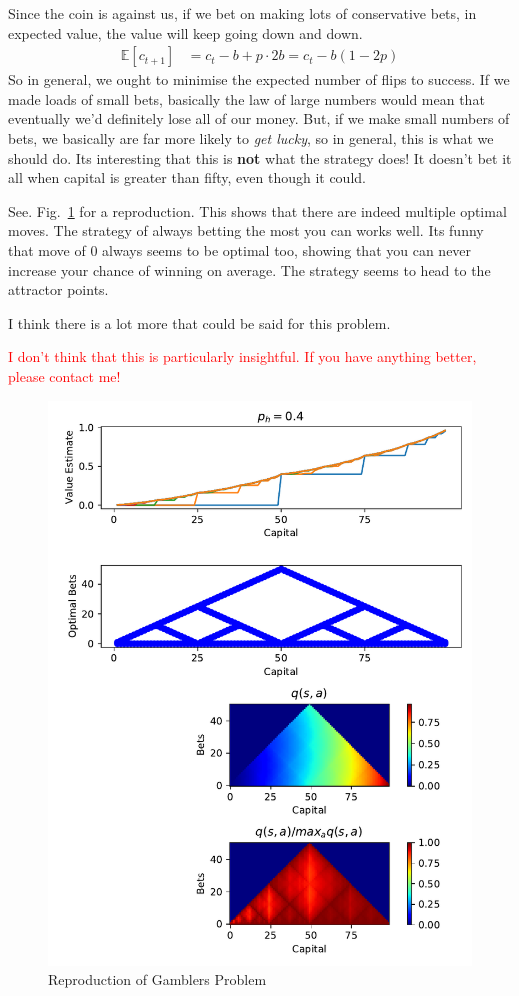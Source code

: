 \documentclass{article}
\begin{document}
Since the coin is against us, if we bet on making lots of conservative bets, in expected value, the value will keep going down and down. 
\begin{align}
\mathbb{E}[c_{t+1}] &= c_t - b + p\cdot 2b = c_t -b (1 - 2p)  
\end{align}
So in general, we ought to minimise the expected number of flips to success. If we made loads of small bets, basically the law of large numbers would mean that eventually we'd definitely lose all of our money. But, if we make small numbers of bets, we basically are far more likely to \emph{get lucky}, so in general, this is what we should do. Its interesting that this is \textbf{not} what the strategy does! It doesn't bet it all when capital is greater than fifty, even though it could. 

See. Fig.~\ref{fig:reprod} for a reproduction. This shows that there are indeed multiple optimal moves. The strategy of always betting the most you can works well. Its funny that move of $0$ always seems to be optimal too, showing that you can never increase your chance of winning on average. The strategy seems to head to the attractor points.   

I think there is a lot more that could be said for this problem. 

\textcolor{red}{I don't think that this is particularly insightful. If you have anything better, please contact me!}

\begin{figure}
	\includegraphics[width=\textwidth]{reprod}
	\centering
	\caption{\label{fig:reprod} Reproduction of Gamblers Problem}
\end{figure} 
\end{document}
